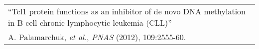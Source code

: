 \begin{tabularx}{\textwidth}{ X }
  ``Tcl1 protein functions as an inhibitor of de novo DNA methylation in B-cell chronic lymphocytic leukemia (CLL)'' \\
  \small{A. Palamarchuk, \textit{et al.}, \textit{PNAS} (2012), 109:2555-60.} \\
\end{tabularx}
